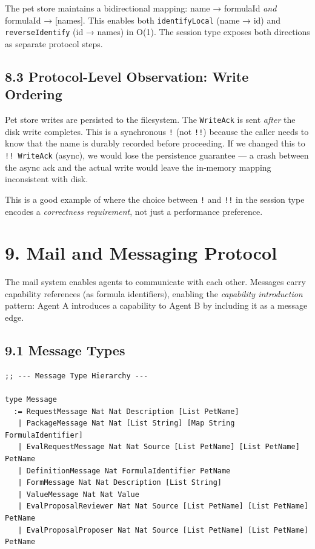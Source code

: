 \documentclass[11pt]{article}
\begin{document}
The pet store maintains a bidirectional mapping: name → formulaId \emph{and}
formulaId → [names]. This enables both \texttt{identifyLocal} (name → id) and
\texttt{reverseIdentify} (id → names) in O(1). The session type exposes both
directions as separate protocol steps.
\subsection{8.3 Protocol-Level Observation: Write Ordering}
\label{sec:org3ebe539}

Pet store writes are persisted to the filesystem. The \texttt{WriteAck} is sent
\emph{after} the disk write completes. This is a synchronous \texttt{!} (not \texttt{!!})
because the caller needs to know that the name is durably recorded before
proceeding. If we changed this to \texttt{!! WriteAck} (async), we would lose
the persistence guarantee --- a crash between the async ack and the actual
write would leave the in-memory mapping inconsistent with disk.

This is a good example of where the choice between \texttt{!} and \texttt{!!} in the
session type encodes a \emph{correctness requirement}, not just a performance
preference.
\section{9. Mail and Messaging Protocol}
\label{sec:orge0de794}

The mail system enables agents to communicate with each other. Messages carry
capability references (as formula identifiers), enabling the \emph{capability
introduction} pattern: Agent A introduces a capability to Agent B by
including it as a message edge.
\subsection{9.1 Message Types}
\label{sec:org0320791}

\begin{verbatim}
;; --- Message Type Hierarchy ---

type Message
  := RequestMessage Nat Nat Description [List PetName]
   | PackageMessage Nat Nat [List String] [Map String FormulaIdentifier]
   | EvalRequestMessage Nat Nat Source [List PetName] [List PetName] PetName
   | DefinitionMessage Nat FormulaIdentifier PetName
   | FormMessage Nat Nat Description [List String]
   | ValueMessage Nat Nat Value
   | EvalProposalReviewer Nat Nat Source [List PetName] [List PetName] PetName
   | EvalProposalProposer Nat Nat Source [List PetName] [List PetName] PetName
\end{verbatim}
\end{document}
